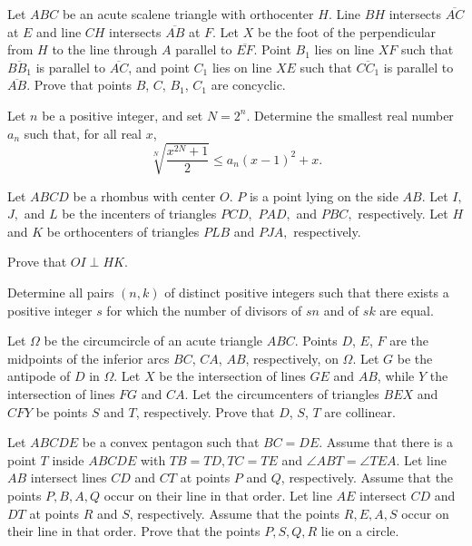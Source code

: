 \documentclass[11pt]{scrartcl}
\begin{document}
\begin{problem}[15595788767204175]
Let \(ABC\) be an acute scalene triangle with orthocenter \(H\). Line \(BH\) intersects \(\overline{AC}\) at \(E\) and line \(CH\) intersects \(\overline{AB}\) at \(F\). Let \(X\) be the foot of the perpendicular from \(H\) to the line through \(A\) parallel to \(\overline{EF}\). Point \(B_1\) lies on line \(XF\) such that \(\overline{BB_1}\) is parallel to \(\overline{AC}\), and point \(C_1\) lies on line \(XE\) such that \(\overline{CC_1}\) is parallel to \(\overline{AB}\). Prove that points \(B\), \(C\), \(B_1\), \(C_1\) are concyclic.
\end{problem}
\begin{problem}[9026100911884959358]
Let $n$ be a positive integer, and set $N=2^{n}$. Determine the smallest real number $a_{n}$ such that, for all real $x$,
\[
\sqrt[N]{\frac{x^{2 N}+1}{2}} \leqslant a_{n}(x-1)^{2}+x .
\]
\end{problem}
\begin{problem}[857598260795435]
Let $ ABCD $ be a rhombus with center $ O. $ $ P $ is a point lying on the side $ AB. $ Let $ I, $ $ J, $ and $ L $ be the incenters of triangles $ PCD, $ $ PAD, $ and $PBC, $ respectively. Let $ H $ and $ K $ be orthocenters of triangles $ PLB $ and $ PJA, $ respectively.

Prove that $ OI \perp HK. $
\end{problem}
\begin{problem}[569685816807741]
Determine all pairs $(n, k)$ of distinct positive integers such that there exists a positive integer $s$ for which the number of divisors of $sn$ and of $sk$ are equal.
\end{problem}
\begin{problem}[607556370102952]
Let $\Omega$ be the circumcircle of an acute triangle $ABC$. Points $D$, $E$, $F$ are the midpoints of the inferior arcs $BC$, $CA$, $AB$, respectively, on $\Omega$. Let $G$ be the antipode of $D$ in $\Omega$. Let $X$ be the intersection of lines $GE$ and $AB$, while $Y$ the intersection of lines $FG$ and $CA$. Let the circumcenters of triangles $BEX$ and $CFY$ be points $S$ and $T$, respectively. Prove that $D$, $S$, $T$ are collinear.
\end{problem}
\begin{problem}[8417327567048605288]
Let $ABCDE$ be a convex pentagon such that $BC=DE$. Assume that there is a point $T$ inside $ABCDE$ with $TB=TD,TC=TE$ and $\angle ABT = \angle TEA$. Let line $AB$ intersect lines $CD$ and $CT$ at points $P$ and $Q$, respectively. Assume that the points $P,B,A,Q$ occur on their line in that order. Let line $AE$ intersect $CD$ and $DT$ at points $R$ and $S$, respectively. Assume that the points $R,E,A,S$ occur on their line in that order. Prove that the points $P,S,Q,R$ lie on a circle.
\end{problem}
\end{document}
